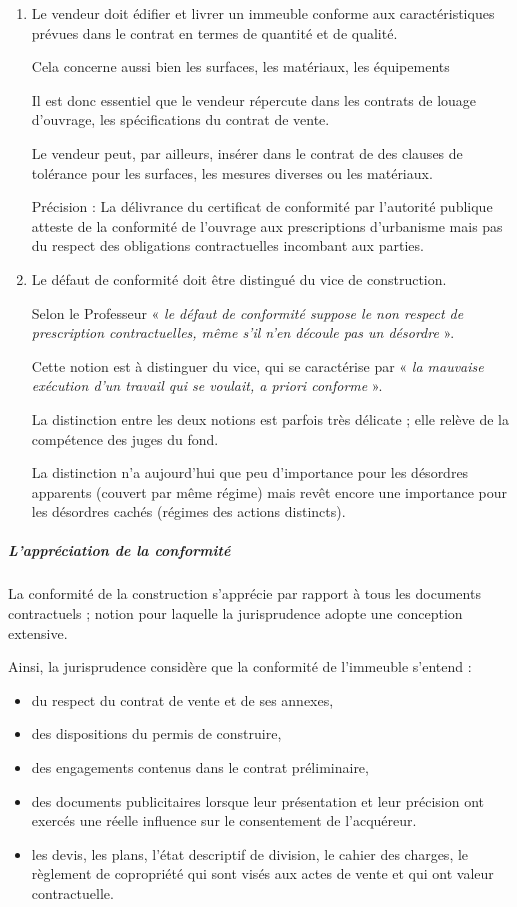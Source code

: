 					\begin{enumerate}
						\item  Le vendeur doit édifier et livrer un immeuble conforme aux caractéristiques prévues dans le contrat en termes de quantité et de qualité.

						Cela concerne aussi bien les surfaces, les matériaux, les équipements \etc

						Il est donc essentiel que le vendeur répercute dans les contrats de louage d’ouvrage, les spécifications du contrat de vente.

						Le vendeur peut, par ailleurs, insérer dans le contrat de \VEFA des clauses de tolérance pour les surfaces, les mesures diverses ou les matériaux.

						Précision : La délivrance du certificat de conformité par l’autorité publique atteste de la conformité de l’ouvrage aux prescriptions d’urbanisme mais pas du respect des obligations contractuelles incombant aux parties.


						\item Le défaut de conformité doit être distingué du vice de construction.

						Selon le Professeur  « \emph{le défaut de conformité suppose le non respect de prescription contractuelles, même s’il n’en découle pas un désordre} ».

						Cette notion est à distinguer du vice, qui se caractérise par « \emph{la mauvaise exécution d’un travail qui se voulait, a priori conforme} ».

						La distinction entre les deux notions est parfois très délicate ; elle relève de la compétence des juges du fond.

						La distinction n’a aujourd’hui que peu d’importance pour les désordres apparents (couvert par même régime) mais revêt encore une importance pour les désordres cachés (régimes des actions distincts).
					\end{enumerate}


				\subparagraph{L'appréciation de la conformité}

					La conformité de la construction s’apprécie par rapport à tous les documents contractuels ; notion pour laquelle la jurisprudence adopte une conception extensive.

					Ainsi, la jurisprudence considère que la conformité de l’immeuble s’entend :
					\begin{itemize}
						\item du respect du contrat de vente et de ses annexes,
						\item des dispositions du permis de construire,
						\item des engagements contenus dans le contrat préliminaire,
						\item des documents publicitaires lorsque leur présentation et leur précision ont exercés une réelle influence sur le consentement de l’acquéreur.
						\item les devis, les plans, l’état descriptif de division, le cahier des charges, le règlement de copropriété qui sont visés aux actes de vente et qui ont valeur contractuelle.
					\end{itemize}

